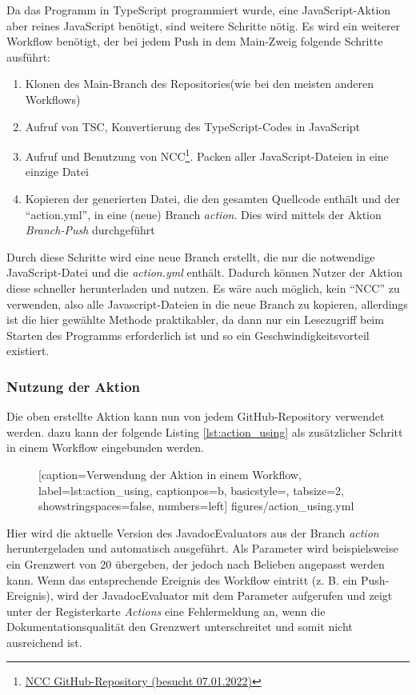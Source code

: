 \bigskip
Da das Programm in TypeScript programmiert wurde, eine JavaScript-Aktion aber reines JavaScript benötigt, sind weitere Schritte nötig. Es wird ein weiterer Workflow benötigt, der bei jedem Push in dem Main-Zweig folgende Schritte ausführt:
\begin{enumerate}
    \item Klonen des Main-Branch des Repositories(wie bei den meisten anderen Workflows)
    \item Aufruf von TSC, Konvertierung des TypeScript-Codes in JavaScript
    \item Aufruf und Benutzung von NCC\footnote{\href{https://github.com/vercel/ncc}{NCC GitHub-Repository (besucht 07.01.2022)}}. Packen aller JavaScript-Dateien in eine einzige Datei
    \item Kopieren der generierten Datei, die den gesamten Quellcode enthält und der \enquote{action.yml}, in eine (neue) Branch \textit{action}. Dies wird mittels der Aktion \textit{Branch-Push}\cite{Branch-Push} durchgeführt
\end{enumerate}
Durch diese Schritte wird eine neue Branch erstellt, die nur die notwendige JavaScript-Datei und die \textit{action.yml} enthält. Dadurch können Nutzer der Aktion diese schneller herunterladen und nutzen. Es wäre auch möglich, kein \enquote{NCC} zu verwenden, also alle Javascript-Dateien in die neue Branch zu kopieren, allerdings ist die hier gewählte Methode praktikabler, da dann nur ein Lesezugriff beim Starten des Programms erforderlich ist und so ein Geschwindigkeitsvorteil existiert. 

\subsubsection{Nutzung der Aktion}

Die oben erstellte Aktion kann nun von jedem GitHub-Repository verwendet werden. dazu kann der folgende Listing \ref{lst:action_using} als zusätzlicher Schritt in einem Workflow eingebunden werden. 
\begin{figure} [htbp]

[caption={Verwendung der Aktion in einem Workflow},
label={lst:action_using},
captionpos=b, basicstyle=\footnotesize, tabsize=2, showstringspaces=false,  numbers=left]
{figures/action_using.yml}
\end{figure}

Hier wird die aktuelle Version des JavadocEvaluators aus der Branch \textit{action} heruntergeladen und automatisch ausgeführt. Als Parameter wird beispielsweise ein Grenzwert von 20 übergeben, der jedoch nach Belieben angepasst werden kann. Wenn das entsprechende Ereignis des Workflow eintritt (z. B. ein Push-Ereignis), wird der JavadocEvaluator mit dem Parameter aufgerufen und zeigt unter der Registerkarte \textit{Actions} eine Fehlermeldung an, wenn die Dokumentationsqualität den Grenzwert unterschreitet und somit nicht ausreichend ist.
